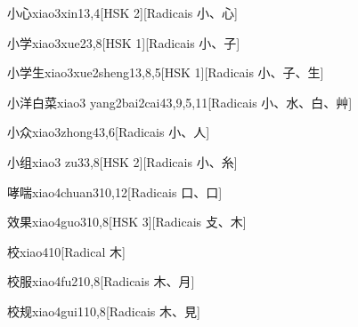 \begin{entry}{小心}{xiao3xin1}{3,4}[HSK 2][Radicais ⼩、⼼]
\end{entry}

\begin{entry}{小学}{xiao3xue2}{3,8}[HSK 1][Radicais ⼩、⼦]
\end{entry}

\begin{entry}{小学生}{xiao3xue2sheng1}{3,8,5}[HSK 1][Radicais ⼩、⼦、⽣]
\end{entry}

\begin{entry}{小洋白菜}{xiao3 yang2bai2cai4}{3,9,5,11}[Radicais ⼩、⽔、⽩、⾋]
\end{entry}

\begin{entry}{小众}{xiao3zhong4}{3,6}[Radicais ⼩、⼈]
\end{entry}

\begin{entry}{小组}{xiao3 zu3}{3,8}[HSK 2][Radicais ⼩、⽷]
\end{entry}

\begin{entry}{哮喘}{xiao4chuan3}{10,12}[Radicais ⼝、⼝]
\end{entry}

\begin{entry}{效果}{xiao4guo3}{10,8}[HSK 3][Radicais ⽁、⽊]
\end{entry}

\begin{entry}{校}{xiao4}{10}[Radical ⽊]
\end{entry}

\begin{entry}{校服}{xiao4fu2}{10,8}[Radicais ⽊、⽉]
\end{entry}

\begin{entry}{校规}{xiao4gui1}{10,8}[Radicais ⽊、⾒]
\end{entry}

